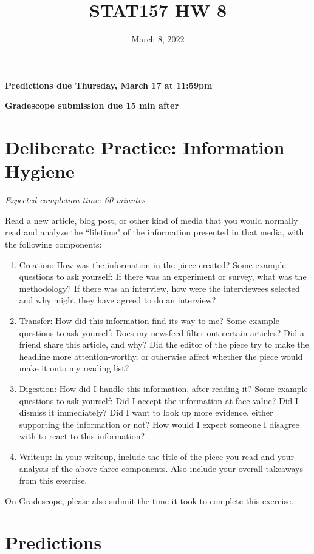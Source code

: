 \documentclass[11pt]{article}
\title{STAT157 HW 8}
\date{March 8, 2022}
\begin{document}
\maketitle

\hfill \textbf{Predictions due Thursday, March 17 at 11:59pm}

\hfill \textbf{Gradescope submission due 15 min after}


\section*{Deliberate Practice: Information Hygiene}

\emph{Expected completion time: 60 minutes}

Read a new article, blog post, or other kind of media that you would normally read and analyze the ``lifetime" of the information presented in that media, with the following components:
\begin{enumerate}
	\item Creation: How was the information in the piece created? Some example questions to ask yourself: If there was an experiment or survey, what was the methodology? If there was an interview, how were the interviewees selected and why might they have agreed to do an interview? 
	\item Transfer: How did this information find its way to me? Some example questions to ask yourself: Does my newsfeed filter out certain articles? Did a friend share this article, and why? Did the editor of the piece try to make the headline more attention-worthy, or otherwise affect whether the piece would make it onto my reading list?
	\item Digestion: How did I handle this information, after reading it? Some example questions to ask yourself: Did I accept the information at face value? Did I dismiss it immediately? Did I want to look up more evidence, either supporting the information or not? How would I expect someone I disagree with to react to this information?
	\item Writeup: In your writeup, include the title of the piece you read and your analysis of the above three components. Also include your overall takeaways from this exercise.
\end{enumerate}

On Gradescope, please also submit the time it took to complete this exercise.


\section*{Predictions}
\end{document}
